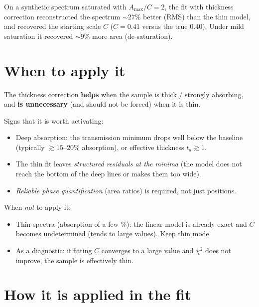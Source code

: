 \documentclass[11pt,a4paper]{article}
\begin{document}
\begin{nota}[Verification]
On a synthetic spectrum saturated with $A_{\max}/C=2$, the fit with thickness
correction reconstructed the spectrum $\sim27\%$ better (RMS) than the thin
model, and recovered the starting scale $C$ ($C=0.41$ versus the true $0.40$).
Under mild saturation it recovered $\sim9\%$ more area (de-saturation).
\end{nota}

\section{When to apply it}

\begin{aviso}
The thickness correction \textbf{helps} when the sample is thick / strongly
absorbing, and \textbf{is unnecessary} (and should not be forced) when it is thin.
\end{aviso}

Signs that it is worth activating:
\begin{itemize}[leftmargin=*]
  \item Deep absorption: the transmission minimum drops well below the baseline
        (typically $\gtrsim 15$--$20\%$ absorption), or effective thickness
        $t_a\gtrsim 1$.
  \item The thin fit leaves \emph{structured residuals at the minima} (the model
        does not reach the bottom of the deep lines or makes them too wide).
  \item \emph{Reliable phase quantification} (area ratios) is required, not
        just positions.
\end{itemize}
When \emph{not} to apply it:
\begin{itemize}[leftmargin=*]
  \item Thin spectra (absorption of a few \%): the linear model is already exact
        and $C$ becomes undetermined (tends to large values). Keep thin mode.
  \item As a diagnostic: if fitting $C$ converges to a large value and $\chi^2$
        does not improve, the sample is effectively thin.
\end{itemize}

\section{How it is applied in the fit}
\end{document}
